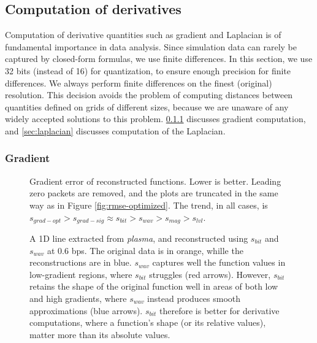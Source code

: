 \subsection{Computation of derivatives}\label{sec:derivatives}
Computation of derivative quantities such as gradient and Laplacian is of fundamental importance in
data analysis. Since simulation data can rarely be captured by closed-form formulas, we use finite
differences. In this section, we use 32 bits (instead of 16) for quantization, to ensure enough
precision for finite differences. We always perform finite differences on the finest (original)
resolution. This decision avoids the problem of computing distances between quantities defined on
grids of different sizes, because we are unaware of any widely accepted solutions to this problem.
\cref{sec:gradient} discusses gradient computation, and \cref{sec:laplacian} discusses
computation of the Laplacian.

\subsubsection{Gradient}\label{sec:gradient}

\begin{figure}[h]
	\centering
	 \caption{Gradient
	error of reconstructed functions. Lower is better. Leading zero packets are removed, and the plots
	are truncated in the same way as in Figure \ref{fig:rmse-optimized}. The trend, in all cases, is
	$s_{grad-opt} > s_{grad-sig} \approx s_{bit} > s_{wav} > s_{mag} > s_{lvl}$.}
	\label{fig:gradient-error-comparison}
\end{figure}

\begin{figure}[h]
	\centering
	\caption{A 1D line extracted from \emph{plasma}, and reconstructed using $s_{bit}$ and $s_{wav}$ at
	0.6 bps. The original data is in orange, whille the reconstructions are in blue. $s_{wav}$ captures
	well the function values in low-gradient regions, where $s_{bit}$ struggles (red arrows).
	However, $s_{bit}$ retains the shape of the original function well in areas of both low and high
	gradients, where $s_{wav}$ instead produces smooth approximations (blue arrows). $s_{bit}$
	therefore is better for	derivative computations, where a function's shape (or its relative
	values), matter more than its absolute values.}\label{fig:bit-plane-vs-wavelet-norm-gradient}
\end{figure}

